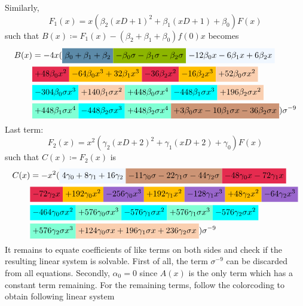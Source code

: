 \begin{solution}
Similarly,
\[
    F_1(x) = x (\beta_2 (xD + 1)^2 + \beta_1(xD + 1) + \beta_0) F(x)
\]
such that $B(x) \coloneq F_1(x) - (\beta_2 + \beta_1 + \beta_0) f(0)x$ becomes
\begin{align*}
    B(x) &= -4 x (\hl{airforceblue}{\beta_0 + \beta_1 + \beta_2} \hl{applegreen}{- \beta_0 \sigma - \beta_1 \sigma - \beta_2 \sigma} \hl{aliceblue}{- 12 \beta_0 x - 6 \beta_1 x + 6 \beta_2 x} \\
    & \hl{amaranth}{+ 48 \beta_0 x^2 }\hl{amber}{- 64 \beta_0 x^3 + 32 \beta_1 x^3} \hl{amaranth}{- 36 \beta_2 x^2}\hl{amber}{ - 16 \beta_2 x^3} \hl{apricot}{+ 52 \beta_0 \sigma x^2} \\
    &\hl{aqua}{- 304 \beta_0 \sigma x^3} \hl{apricot}{+ 140 \beta_1 \sigma x^2} \hl{aquamarine}{+ 448 \beta_0 \sigma x^4} \hl{aqua}{- 448 \beta_1 \sigma x^3} \hl{apricot}{+ 196 \beta_2 \sigma x^2} \\
    &\hl{aquamarine}{+ 448 \beta_1 \sigma x^4 }\hl{aqua}{- 448 \beta_2 \sigma x^3} \hl{aquamarine}{+ 448 \beta_2 \sigma x^4} \hl{antiquebrass}{+ 3 \beta_0 \sigma x - 10 \beta_1 \sigma x - 36 \beta_2 \sigma x})\sigma^{-9}
\end{align*}
Last term:
\[
    F_2(x) = x^2 (\gamma_2(xD+2)^2 + \gamma_1(xD + 2) + \gamma_0)F(x)
\]
such that $C(x) \coloneq F_2(x)$ is 
\begin{align*}
    C(x) &= -x^2 (\hl{aliceblue}{4 \gamma_0 + 8 \gamma_1 + 16 \gamma_2}\hl{antiquebrass}{ - 11 \gamma_0 \sigma - 22 \gamma_1 \sigma - 44 \gamma_2 \sigma }\hl{amaranth}{- 48 \gamma_0 x - 72 \gamma_1 x} \\
    &\hl{amaranth}{- 72 \gamma_2 x}\hl{amber}{+ 192 \gamma_0 x^2}\hl{amethyst}{ - 256 \gamma_0 x^3}\hl{amber}{ + 192 \gamma_1 x^2} \hl{amethyst}{- 128 \gamma_1 x^3} \hl{amber}{+ 48 \gamma_2 x^2} \hl{amethyst}{- 64 \gamma_2 x^3} \\
    &\hl{aqua}{- 464 \gamma_0 \sigma x^2}\hl{aquamarine}{ + 576 \gamma_0 \sigma x^3 }\hl{aqua}{- 576 \gamma_1 \sigma x^2} \hl{aquamarine}{+ 576 \gamma_1 \sigma x^3 }\hl{aqua}{- 576 \gamma_2 \sigma x^2} \\
    & \hl{aquamarine}{+ 576 \gamma_2 \sigma x^3 }\hl{apricot}{+ 124 \gamma_0 \sigma x + 196 \gamma_1 \sigma x + 236 \gamma_2 \sigma x})\sigma^{-9}
\end{align*}
It remains to equate coefficients of like terms on both sides and check if the resulting linear system is solvable. First of all, the term $\sigma^{-9}$ can be discarded from all equations. Secondly, $\alpha_0=0$ since $A(x)$ is the only term which has a constant term remaining. For the remaining terms, follow the colorcoding to obtain following linear system

\end{solution}
